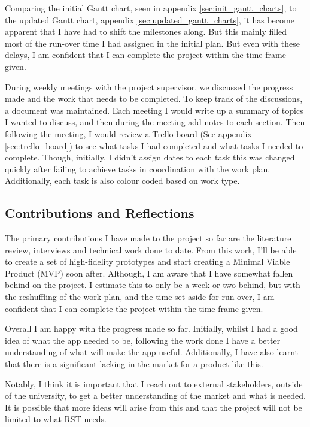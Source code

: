 \documentclass [11pt,a4paper]{article}
\begin{document}
Comparing the initial Gantt chart, seen in appendix \ref{sec:init_gantt_charts}, to the updated Gantt chart, appendix \ref{sec:updated_gantt_charts}, it has become apparent that I have had to shift the milestones along. But this mainly filled most of the run-over time I had assigned in the initial plan. But even with these delays, I am confident that I can complete the project within the time frame given.

During weekly meetings with the project supervisor, we discussed the progress made and the work that needs to be completed. To keep track of the discussions, a document was maintained. Each meeting I would write up a summary of topics I wanted to discuss, and then during the meeting add notes to each section. Then following the meeting, I would review a Trello board (See appendix \ref{sec:trello_board}) to see what tasks I had completed and what tasks I needed to complete. Though, initially, I didn't assign dates to each task this was changed quickly after failing to achieve tasks in coordination with the work plan. Additionally, each task is also colour coded based on work type. 

\subsection{Contributions and Reflections}
\label{sec:contributions}
The primary contributions I have made to the project so far are the literature review, interviews and technical work done to date. From this work, I'll be able to create a set of high-fidelity prototypes and start creating a Minimal Viable Product (MVP) soon after. Although, I am aware that I have somewhat fallen behind on the project. I estimate this to only be a week or two behind, but with the reshuffling of the work plan, and the time set aside for run-over, I am confident that I can complete the project within the time frame given.

Overall I am happy with the progress made so far. Initially, whilst I had a good idea of what the app needed to be, following the work done I have a better understanding of what will make the app useful. Additionally, I have also learnt that there is a significant lacking in the market for a product like this. 


Notably, I think it is important that I reach out to external stakeholders, outside of the university, to get a better understanding of the market and what is needed. It is possible that more ideas will arise from this and that the project will not be limited to what RST needs. 
\end{document}
